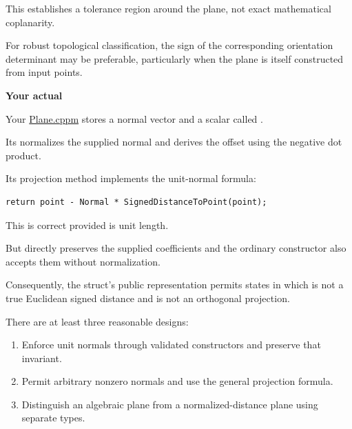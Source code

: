 This establishes a tolerance region around the plane, not exact mathematical coplanarity.

For robust topological classification, the sign of the corresponding orientation determinant may be preferable, particularly when the plane is itself constructed from input points.

\textbf{Your actual }

Your \href{https://github.com/swayam8624/KairoGeometry/blob/master/Plane.cppm?utm_source=chatgpt.com}{Plane.cppm} stores a normal vector and a scalar called .

Its  normalizes the supplied normal and derives the offset using the negative dot product.

Its projection method implements the unit-normal formula:

\begin{verbatim}
return point - Normal * SignedDistanceToPoint(point);
\end{verbatim}

This is correct provided  is unit length.

But  directly preserves the supplied coefficients and the ordinary constructor also accepts them without normalization.

Consequently, the struct's public representation permits states in which  is not a true Euclidean signed distance and  is not an orthogonal projection.

There are at least three reasonable designs:

\begin{enumerate}
\def\labelenumi{\arabic{enumi}.}
\tightlist
\item
  Enforce unit normals through validated constructors and preserve that invariant.
\item
  Permit arbitrary nonzero normals and use the general projection formula.
\item
  Distinguish an algebraic plane from a normalized-distance plane using separate types.
\end{enumerate}

